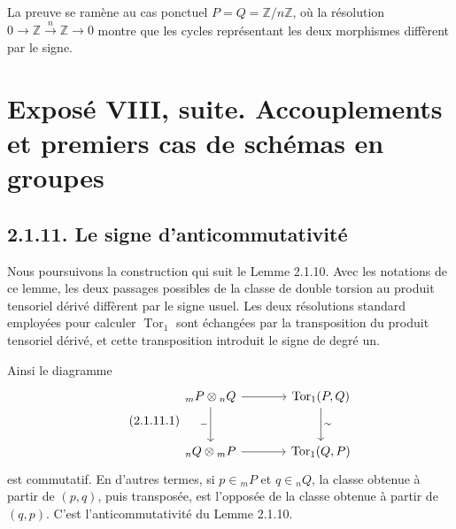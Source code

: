 \documentclass[11pt]{article}
\providecommand{\Tor}{\operatorname{Tor}}
\begin{document}
La preuve se ramène au cas ponctuel \(P=Q=\mathbb Z/n\mathbb Z\), où la résolution \(0\to\mathbb Z\xrightarrow{n}\mathbb Z\to0\) montre que les cycles représentant les deux morphismes diffèrent par le signe.



\providecommand{\Biext}{\operatorname{Biext}}
\providecommand{\BIEXT}{\operatorname{BIEXT}}
\providecommand{\AB}{\operatorname{AB}}
\providecommand{\coker}{\operatorname{coker}}
\providecommand{\Coker}{\operatorname{Coker}}
\providecommand{\Homab}{\operatorname{Hom}_{\mathrm{ab}}}
\providecommand{\Homgr}{\operatorname{Hom}_{\mathrm{gr}}}
\providecommand{\Cart}{\operatorname{Cart}}
\providecommand{\Bil}{\operatorname{Bil}}
\providecommand{\tE}{\,{}^{t}\!E}
\providecommand{\G}{\mathcal G}
\providecommand{\T}{\mathcal T}
\providecommand{\Zmod}{\mathbb Z\text{-}\mathrm{Mod}}


\section*{Exposé VIII, suite. Accouplements et premiers cas de schémas en groupes}

\subsection*{2.1.11. Le signe d'anticommutativité}

Nous poursuivons la construction qui suit le Lemme 2.1.10.  Avec les notations de ce lemme, les deux passages possibles de la classe de double torsion au produit tensoriel dérivé diffèrent par le signe usuel.  Les deux résolutions standard employées pour calculer \(\Tor_1\) sont échangées par la transposition du produit tensoriel dérivé, et cette transposition introduit le signe de degré un.

Ainsi le diagramme
\begin{equation}\tag{2.1.11.1}
\begin{tikzcd}[column sep=large,row sep=large]
 {}_mP\otimes {}_nQ \arrow[r] \arrow[d,"-"'] & \Tor_1(P,Q)\arrow[d,"\sim"]\\
 {}_nQ\otimes {}_mP \arrow[r] & \Tor_1(Q,P)
\end{tikzcd}
\end{equation}
est commutatif.  En d'autres termes, si \(p\in{}_mP\) et \(q\in{}_nQ\), la classe obtenue à partir de \((p,q)\), puis transposée, est l'opposée de la classe obtenue à partir de \((q,p)\).  C'est l'anticommutativité du Lemme 2.1.10.
\end{document}
